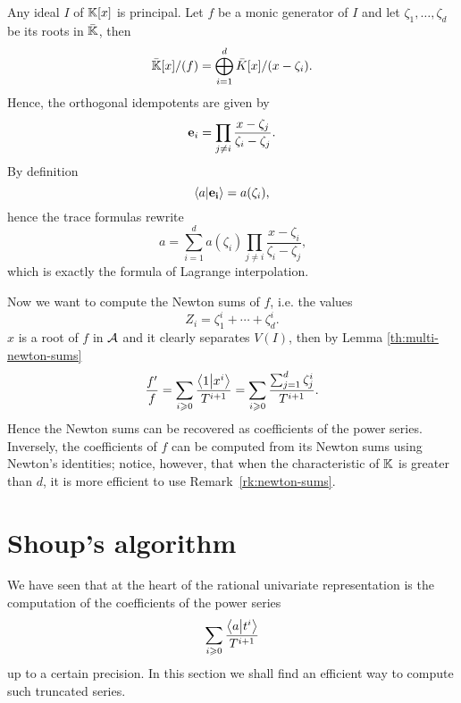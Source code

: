 Any ideal $I$ of $\mathbb{K}[x]$ is principal. Let $f$ be a monic generator of
$I$ and let $\zeta_1,\ldots,\zeta_d$ be its roots in $\bar{\mathbb{K}}$, then
\begin{equation}
  \label{eq:20}
  \bar{\mathbb{K}}[x]/(f) = \bigoplus_{i=1}^d \bar{K}[x]/(x-\zeta_i)
  \text{.}
\end{equation}
Hence, the orthogonal idempotents are given by
\begin{equation}
  \label{eq:29}
  \mathbf{e}_i = \prod_{j\ne i}\frac{x-\zeta_j}{\zeta_i-\zeta_j}
  \text{.}
\end{equation}
By definition
\begin{equation}
  \label{eq:31}
  \left\langle a \middle| \mathbf{e_i} \right\rangle = a(\zeta_i)
  \text{,}
\end{equation}
hence the trace formulas rewrite
\begin{equation}
  \label{eq:35}
  a = \sum_{i=1}^d a(\zeta_i)\prod_{j\ne i}\frac{x-\zeta_i}{\zeta_i-\zeta_j}
  \text{,}
\end{equation}
which is exactly the formula of Lagrange interpolation.

Now we want to compute the Newton sums of $f$, i.e. the values
\begin{equation}
  \label{eq:37}
  Z_i = \zeta_1^i + \cdots + \zeta_d^i
  \text{.}
\end{equation}
$x$ is a root of $f$ in $\mathcal{A}$ and it clearly separates $V(I)$,
then by Lemma \ref{th:multi-newton-sums}
\begin{equation}
  \label{eq:45}
  \frac{f'}{f} = \sum_{i\geqslant0}\frac{\left\langle 1 \middle| x^i \right\rangle}{T^{i+1}} =
  \sum_{i\geqslant0}\frac{\sum_{j=1}^d\zeta_j^i}{T^{i+1}}
  \text{.}
\end{equation}
Hence the Newton sums can be recovered as coefficients of the power
series. Inversely, the coefficients of $f$ can be computed from its
Newton sums using Newton's identities; notice, however, that when the
characteristic of $\mathbb{K}$ is greater than $d$, it is more efficient to
use Remark~\ref{rk:newton-sums}.


\section{Shoup's algorithm}
\label{sec:shoups-algorithm}

We have seen that at the heart of the rational univariate
representation is the computation of the coefficients of the power
series
\begin{equation}
  \label{eq:46}
  \sum_{i\geqslant0}\frac{\left\langle a \middle| t^i \right\rangle}{T^{i+1}}
\end{equation}
up to a certain precision. In this section we shall find an efficient
way to compute such truncated series.

